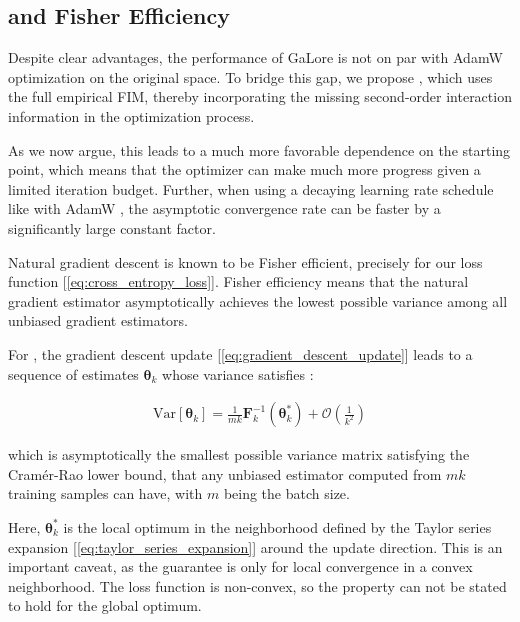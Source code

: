 \subsection{\lowrank and Fisher Efficiency}

Despite clear advantages, the performance of GaLore is not on par with AdamW \citep{loshchilov2017decoupled} optimization on the original space. To bridge this gap, we propose \textit{\lowrank}, which uses the full empirical FIM, thereby incorporating the missing second-order interaction information in the optimization process.

As we now argue, this leads to a much more favorable dependence on the starting point, which means that the optimizer can make much more progress given a limited iteration budget. Further, when using a decaying learning rate schedule like with AdamW \citep{loshchilov2017decoupled}, the asymptotic convergence rate can be faster \citep{martens2020new} by a significantly large constant factor.

Natural gradient descent is known \citep{martens2020new} to be Fisher efficient, precisely for our loss function [\ref{eq:cross_entropy_loss}]. Fisher efficiency means that the natural gradient estimator asymptotically achieves the lowest possible variance among all unbiased gradient estimators.

For \textit{\lowrank}, the gradient descent update [\ref{eq:gradient_descent_update}] leads to a sequence of estimates \( \mathbf{\theta}_{k} \) whose variance satisfies \citep{amariNaturalGradientWorks1998}:

\begin{eqnarray}
\text{Var}[\mathbf{\theta}_{k}] = \frac{1}{mk} \mathbf{F}_{k}^{-1}(\mathbf{\theta}_{k}^*) + \mathcal{O}\left(\frac{1}{k^2}\right)
\label{eq:variance_reduction}
\end{eqnarray}

which is asymptotically the smallest possible variance matrix satisfying the Cramér-Rao lower bound, that any unbiased estimator computed from \(mk\) training samples can have, with \(m\) being the batch size.

Here, \(\mathbf{\theta}_{k}^*\) is the local optimum in the neighborhood defined by the Taylor series expansion [\ref{eq:taylor_series_expansion}] around the update direction. This is an important caveat, as the guarantee is only for local convergence in a convex neighborhood. The loss function is non-convex, so the property can not be stated to hold for the global optimum.

